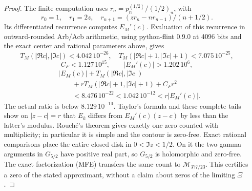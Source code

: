 \documentclass[11pt]{article}
\theoremstyle{remark}\newtheorem{remark}[theorem]{Remark}
\begin{document}
\begin{proof}
The finite computation uses
$r_n=p_n^{(1/2)}/(1/2)_n$, with
\[
 r_0=1,\quad r_1=2z,\quad
 r_{n+1}=(zr_n-nr_{n-1})/(n+1/2).
\]
Its differentiated recurrence computes $E_M'(c)$.
Evaluation of this recurrence in outward-rounded Arb/Acb
arithmetic, using python-flint 0.9.0 at 4096 bits and the exact
center and rational parameters above, gives
\[
 T_M(|\Re c|,|\Im c|)<4.042\,10^{-26},\quad
 T_M(|\Re c|+1,|\Im c|+1)<7.075\,10^{-25},
\]
\[
 C_F<1.127\,10^{15},\qquad |E_M'(c)|>1.202\,10^6,
\]
\[
 \begin{aligned}
 &|E_M(c)|+T_M(|\Re c|,|\Im c|)\\
 &\qquad{}+rT_M(|\Re c|+1,|\Im c|+1)+C_Fr^2\\
 &\qquad{}<8.476\,10^{-22}<1.042\,10^{-12}<r|E_M'(c)|.
 \end{aligned}
\]
The actual ratio is below $8.129\,10^{-10}$. Taylor's formula and
these complete tails show on $|z-c|=r$ that $E_k$ differs from
$E_M'(c)(z-c)$ by less than the latter's modulus.
Rouch\'e's theorem gives exactly one zero counted with multiplicity;
in particular it is simple and the contour is zero-free.
Exact rational comparisons place the entire closed disk in
$0<\Im z<1/2$. On it the two gamma arguments in $G_{5/2}$ have
positive real part, so $G_{5/2}$ is holomorphic and zero-free.
The exact factorization (MFE) transfers the same count to
$\mathcal M_{377/23}$. This certifies a zero of the stated approximant,
without a claim about zeros of the limiting $\Xi$.
\end{proof}
\end{document}
